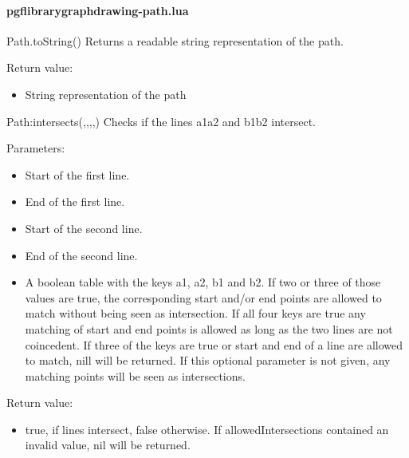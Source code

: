
\paragraph{pgflibrarygraphdrawing-path.lua}


\begin{luacommand}{{Path.toString}()}
Returns a readable string representation of the path.


Return value:
\begin{itemize} \item[] String representation of the path \end{itemize}


\end{luacommand}\begin{luacommand}{{Path:\textunderscore{}intersects}(,,,,)}
Checks if the lines a1a2 and b1b2 intersect.

Parameters:
\begin{itemize}
	\item[]  \subitem Start of the first line.\item[]  \subitem End of the first line.\item[]  \subitem Start of the second line.\item[]  \subitem End of the second line.\item[]  \subitem A boolean table with the keys a1, a2, b1 and b2. If two or three of those values are true, the corresponding start and/or end points are allowed to match without being seen as intersection. If all four keys are true any matching of start and end points is allowed as long as the two lines are not coincedent. If three of the keys are true or start and end of a line are allowed to match, nill will be returned. If this optional parameter is not given, any matching points will be seen as intersections.
\end{itemize}


Return value:
\begin{itemize} \item[] true, if lines intersect, false otherwise. If allowedIntersections contained an invalid value, nil will be returned. \end{itemize}



\end{luacommand}
